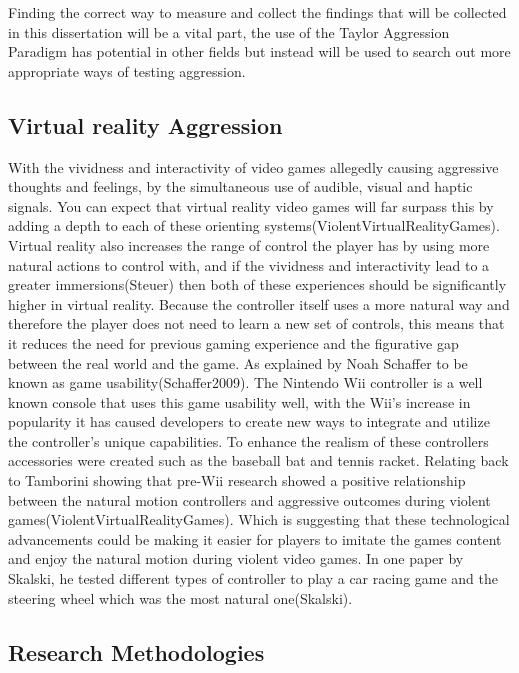 \documentclass[journal]{IEEEtran}
\begin{document}
Finding the correct way to measure and collect the findings that will be collected in this dissertation will be a vital part, the use of the Taylor Aggression Paradigm has potential in other fields but instead will be used to search out more appropriate ways of testing aggression.


    \subsection{Virtual reality Aggression}
        With the vividness and interactivity of video games allegedly causing aggressive thoughts and feelings, by the simultaneous use of audible, visual and haptic signals. You can expect that virtual reality video games will far surpass this by adding a depth to each of these orienting systems(ViolentVirtualRealityGames). Virtual reality also increases the range of control the player has by using more natural actions to control with, and if the vividness and interactivity lead to a greater immersions(Steuer) then both of these experiences should be significantly higher in virtual reality. Because the controller itself uses a more natural way and therefore the player does not need to learn a new set of controls, this means that it reduces the need for previous gaming experience and the figurative gap between the real world and the game. As explained by Noah Schaffer to be known as game usability(Schaffer2009). The Nintendo Wii controller is a well known console that uses this game usability well, with the Wii’s increase in popularity it has caused developers to create new ways to integrate and utilize the controller's unique capabilities. To enhance the realism of these controllers accessories were created such as the baseball bat and tennis racket. Relating back to Tamborini showing that pre-Wii research showed a positive relationship between the natural motion controllers and aggressive outcomes during violent games(ViolentVirtualRealityGames). Which is suggesting that these technological advancements could be making it easier for players to imitate the games content and enjoy the natural motion during violent video games. In one paper by Skalski, he tested different types of controller to play a car racing game and the steering wheel which was the most natural one(Skalski).





    \subsection{Research Methodologies}
    
\end{document}
